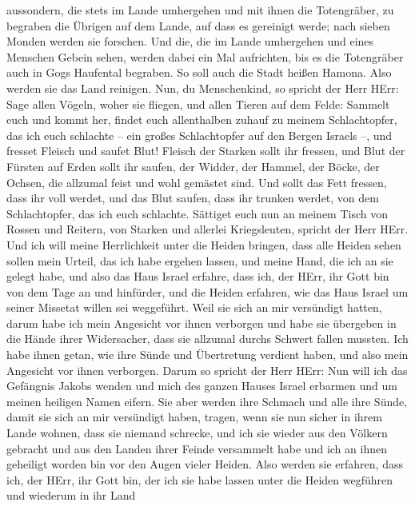 aussondern, die stets im Lande umhergehen und mit ihnen die Totengräber,
zu begraben die Übrigen auf dem Lande, auf dass es gereinigt werde; nach
sieben Monden werden sie forschen.  Und die, die im Lande
umhergehen und eines Menschen Gebein sehen, werden dabei ein Mal
aufrichten, bis es die Totengräber auch in Gogs Haufental begraben.
 So soll auch die Stadt heißen Hamona. Also werden sie das
Land reinigen.  Nun, du Menschenkind, so spricht der Herr
HErr: Sage allen Vögeln, woher sie fliegen, und allen Tieren auf dem
Felde: Sammelt euch und kommt her, findet euch allenthalben zuhauf zu
meinem Schlachtopfer, das ich euch schlachte -- ein großes Schlachtopfer
auf den Bergen Israels --, und fresset Fleisch und saufet Blut!
 Fleisch der Starken sollt ihr fressen, und Blut der
Fürsten auf Erden sollt ihr saufen, der Widder, der Hammel, der Böcke,
der Ochsen, die allzumal feist und wohl gemästet sind.  Und
sollt das Fett fressen, dass ihr voll werdet, und das Blut saufen, dass
ihr trunken werdet, von dem Schlachtopfer, das ich euch schlachte.
 Sättiget euch nun an meinem Tisch von Rossen und Reitern,
von Starken und allerlei Kriegsleuten, spricht der Herr HErr.
 Und ich will meine Herrlichkeit unter die Heiden bringen,
dass alle Heiden sehen sollen mein Urteil, das ich habe ergehen lassen,
und meine Hand, die ich an sie gelegt habe,  und also das
Haus Israel erfahre, dass ich, der HErr, ihr Gott bin von dem Tage an
und hinfürder,  und die Heiden erfahren, wie das Haus
Israel um seiner Missetat willen sei weggeführt. Weil sie sich an mir
versündigt hatten, darum habe ich mein Angesicht vor ihnen verborgen und
habe sie übergeben in die Hände ihrer Widersacher, dass sie allzumal
durchs Schwert fallen mussten.  Ich habe ihnen getan, wie
ihre Sünde und Übertretung verdient haben, und also mein Angesicht vor
ihnen verborgen.  Darum so spricht der Herr HErr: Nun will
ich das Gefängnis Jakobs wenden und mich des ganzen Hauses Israel
erbarmen und um meinen heiligen Namen eifern.  Sie aber
werden ihre Schmach und alle ihre Sünde, damit sie sich an mir
versündigt haben, tragen, wenn sie nun sicher in ihrem Lande wohnen,
dass sie niemand schrecke,  und ich sie wieder aus den
Völkern gebracht und aus den Landen ihrer Feinde versammelt habe und ich
an ihnen geheiligt worden bin vor den Augen vieler Heiden. 
Also werden sie erfahren, dass ich, der HErr, ihr Gott bin, der ich sie
habe lassen unter die Heiden wegführen und wiederum in ihr Land
